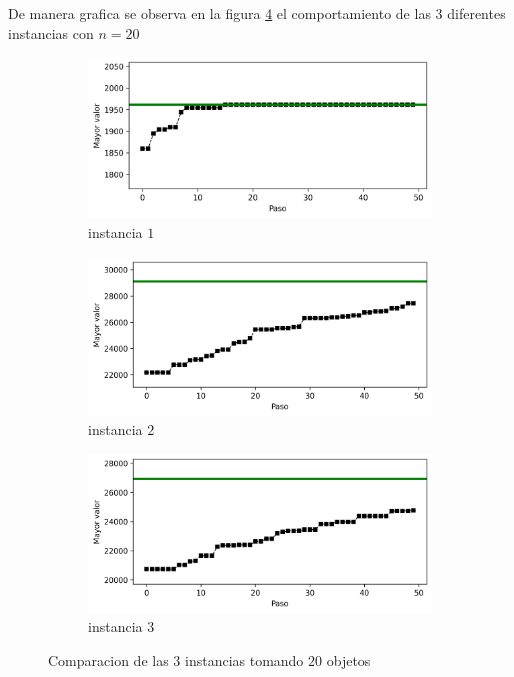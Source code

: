 \documentclass{article}
\begin{document}
De manera grafica se observa en la figura \ref{f3} el comportamiento de las 3 diferentes instancias con $n=20$ 

\begin{figure}[H]
       \centering
       \begin{subfigure}[b]{0.8\linewidth}
           \includegraphics[width=\linewidth]{20i1.png}
           \caption{instancia $1$}
           \label{fig:westminster_lateral}
        \end{subfigure}
        \begin{subfigure}[b]{0.8\linewidth}
            \includegraphics[width=\linewidth]{20i2.png}
            \caption{instancia $2$}
            \label{fig:westminster_aerea}
        \end{subfigure}
        \begin{subfigure}[b]{0.8\linewidth}
           \includegraphics[width=\linewidth]{20i3.png}
           \caption{instancia $3$}
           \label{fig:westminster_aerea}
        \end{subfigure}
        \caption{Comparacion de las $3$ instancias tomando $20$ objetos}
        \label{f3}
\end{figure}
\end{document}
